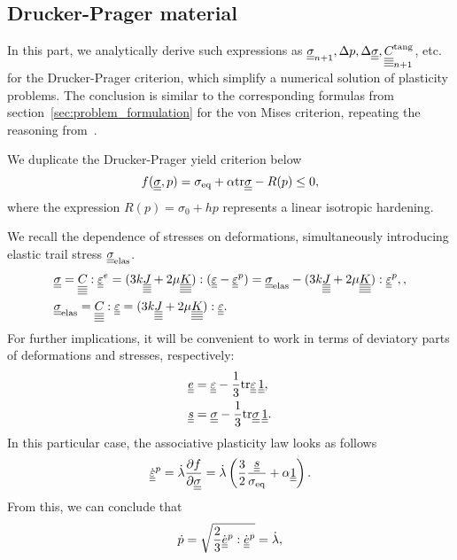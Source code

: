 \documentclass[12pt]{article}
\begin{document}
\newpage
\begin{appendices}
    \section{Drucker-Prager material}
    \label{appendix:DP}
    In this part, we analytically derive such expressions as $\uusigman, \Delta p, \Delta\uusigma, \uuuuC{}^\text{tang}_{n+1}$, etc. for the Drucker-Prager criterion, which simplify a numerical solution of plasticity problems. The conclusion is similar to the corresponding formulas from section~\ref{sec:problem_formulation} for the von Mises criterion, repeating the reasoning from~\parencite{bonnet:hal-01083772}.

    We duplicate the Drucker-Prager yield criterion below 
    \begin{equation}
        f(\uusigma, p) = \sigma_{\text{eq}} + \alpha \mtr \uusigma - R(p) \leq 0,
    \end{equation}
    where the expression $R(p) = \sigma_0 + h p $ represents a linear isotropic hardening.

    We recall the dependence of stresses on deformations, simultaneously introducing elastic trail stress $\uusigma_\text{elas}$.
    \begin{align}
        & \uusigma = \uuuuC{} : \uueps^e = (3k\uuuuJ + 2\mu\uuuuK) : (\uueps - \uueps^p) = \uusigma_\text{elas} - (3k\uuuuJ + 2\mu\uuuuK) : \uueps^p, \label{eqn:constitutive_plastic_law}, \\
        & \uusigma_\text{elas} = \uuuuC{} : \uueps = (3k\uuuuJ + 2\mu\uuuuK) : \uueps. \label{eqn:sigma_elas}
    \end{align}
    For further implications, it will be convenient to work in terms of deviatory parts of deformations and stresses, respectively:
    \begin{align*}
        & \uue = \uueps - \frac{1}{3}\mtr\uueps \, \uuUnit, \\
        & \uus = \uusigma - \frac{1}{3}\mtr\uusigma \, \uuUnit.
    \end{align*}
    In this particular case, the associative plasticity law looks as follows
    \begin{equation}\label{eqn:plasticity_law}
        \dot{\uueps}^p = \dot{\lambda} \frac{\partial f}{\partial \uusigma} = \dot{\lambda} \left(\frac{3}{2} \frac{\uus}{\sigma_\text{eq}} + \alpha \uuUnit \right).
    \end{equation}
    From this, we can conclude that 
    \begin{equation}\label{eqn:p_lambda}
        \dot{p} = \sqrt{\frac{2}{3} \dot{\uue}^p : \dot{\uue}^p} = \dot{\lambda}, 
    \end{equation}


\end{appendices}
\end{document}

